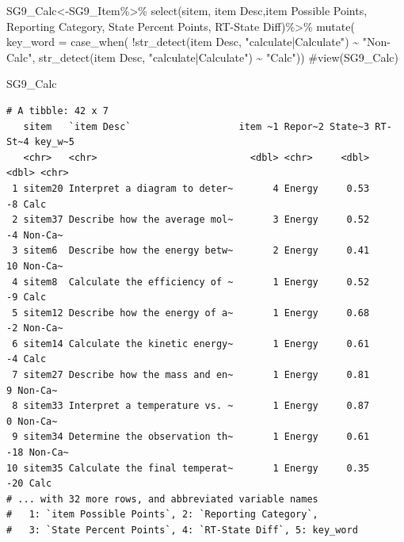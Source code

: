 \documentclass[
  letterpaper,
  DIV=11,
  numbers=noendperiod]{scrartcl}
\newenvironment{Shaded}{\begin{snugshade}}{\end{snugshade}}
\newcommand{\AttributeTok}[1]{\textcolor[rgb]{0.40,0.45,0.13}{#1}}
\newcommand{\CommentTok}[1]{\textcolor[rgb]{0.37,0.37,0.37}{#1}}
\newcommand{\FunctionTok}[1]{\textcolor[rgb]{0.28,0.35,0.67}{#1}}
\newcommand{\NormalTok}[1]{\textcolor[rgb]{0.00,0.23,0.31}{#1}}
\newcommand{\OtherTok}[1]{\textcolor[rgb]{0.00,0.23,0.31}{#1}}
\newcommand{\SpecialCharTok}[1]{\textcolor[rgb]{0.37,0.37,0.37}{#1}}
\newcommand{\StringTok}[1]{\textcolor[rgb]{0.13,0.47,0.30}{#1}}
\begin{document}
\begin{Shaded}
\begin{Highlighting}[]
\NormalTok{SG9\_Calc}\OtherTok{\textless{}{-}}\NormalTok{SG9\_Item}\SpecialCharTok{\%\textgreater{}\%}
  \FunctionTok{select}\NormalTok{(}\StringTok{\textasciigrave{}}\AttributeTok{sitem}\StringTok{\textasciigrave{}}\NormalTok{, }\StringTok{\textasciigrave{}}\AttributeTok{item Desc}\StringTok{\textasciigrave{}}\NormalTok{,}\StringTok{\textasciigrave{}}\AttributeTok{item Possible Points}\StringTok{\textasciigrave{}}\NormalTok{, }\StringTok{\textasciigrave{}}\AttributeTok{Reporting Category}\StringTok{\textasciigrave{}}\NormalTok{, }\StringTok{\textasciigrave{}}\AttributeTok{State Percent Points}\StringTok{\textasciigrave{}}\NormalTok{, }\StringTok{\textasciigrave{}}\AttributeTok{RT{-}State Diff}\StringTok{\textasciigrave{}}\NormalTok{)}\SpecialCharTok{\%\textgreater{}\%}
   \FunctionTok{mutate}\NormalTok{( }\AttributeTok{key\_word =} \FunctionTok{case\_when}\NormalTok{(}
     \SpecialCharTok{!}\FunctionTok{str\_detect}\NormalTok{(}\StringTok{\textasciigrave{}}\AttributeTok{item Desc}\StringTok{\textasciigrave{}}\NormalTok{, }\StringTok{"calculate|Calculate"}\NormalTok{) }\SpecialCharTok{\textasciitilde{}} \StringTok{"Non{-}Calc"}\NormalTok{,}
     \FunctionTok{str\_detect}\NormalTok{(}\StringTok{\textasciigrave{}}\AttributeTok{item Desc}\StringTok{\textasciigrave{}}\NormalTok{, }\StringTok{"calculate|Calculate"}\NormalTok{) }\SpecialCharTok{\textasciitilde{}} \StringTok{"Calc"}\NormalTok{))}
\CommentTok{\#view(SG9\_Calc)}

\NormalTok{SG9\_Calc}
\end{Highlighting}
\end{Shaded}

\begin{verbatim}
# A tibble: 42 x 7
   sitem   `item Desc`                   item ~1 Repor~2 State~3 RT-St~4 key_w~5
   <chr>   <chr>                           <dbl> <chr>     <dbl>   <dbl> <chr>  
 1 sitem20 Interpret a diagram to deter~       4 Energy     0.53      -8 Calc   
 2 sitem37 Describe how the average mol~       3 Energy     0.52      -4 Non-Ca~
 3 sitem6  Describe how the energy betw~       2 Energy     0.41      10 Non-Ca~
 4 sitem8  Calculate the efficiency of ~       1 Energy     0.52      -9 Calc   
 5 sitem12 Describe how the energy of a~       1 Energy     0.68      -2 Non-Ca~
 6 sitem14 Calculate the kinetic energy~       1 Energy     0.61      -4 Calc   
 7 sitem27 Describe how the mass and en~       1 Energy     0.81       9 Non-Ca~
 8 sitem33 Interpret a temperature vs. ~       1 Energy     0.87       0 Non-Ca~
 9 sitem34 Determine the observation th~       1 Energy     0.61     -18 Non-Ca~
10 sitem35 Calculate the final temperat~       1 Energy     0.35     -20 Calc   
# ... with 32 more rows, and abbreviated variable names
#   1: `item Possible Points`, 2: `Reporting Category`,
#   3: `State Percent Points`, 4: `RT-State Diff`, 5: key_word
\end{verbatim}
\end{document}
